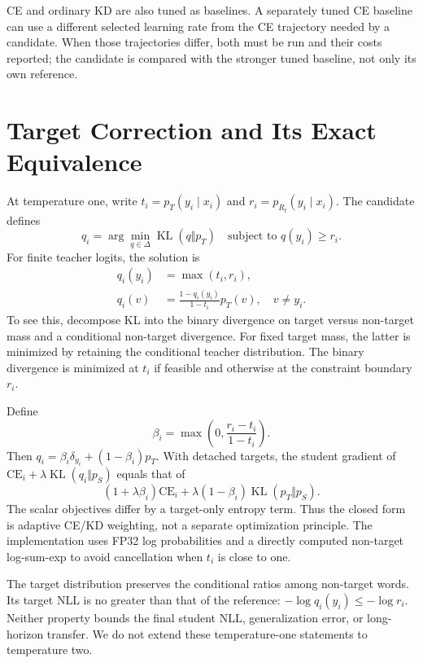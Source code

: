 \documentclass[11pt]{article}
\begin{document}
CE and ordinary KD are also tuned as baselines. A separately tuned CE
baseline can use a different selected learning rate from the CE trajectory
needed by a candidate. When those trajectories differ, both must be run and
their costs reported; the candidate is compared with the stronger tuned
baseline, not only its own reference.

\section{Target Correction and Its Exact Equivalence}
At temperature one, write $t_i=p_T(y_i\mid x_i)$ and
$r_i=p_{R_t}(y_i\mid x_i)$. The candidate defines
\begin{equation}
 q_i=\arg\min_{q\in\Delta}\operatorname{KL}(q\Vert p_T)
 \quad\text{subject to }q(y_i)\geq r_i.
\end{equation}
For finite teacher logits, the solution is
\begin{align}
 q_i(y_i)&=\max(t_i,r_i),\\
 q_i(v)&=\frac{1-q_i(y_i)}{1-t_i}p_T(v),\quad v\ne y_i.
\end{align}
To see this, decompose KL into the binary divergence on target versus
non-target mass and a conditional non-target divergence. For fixed target
mass, the latter is minimized by retaining the conditional teacher
distribution. The binary divergence is minimized at $t_i$ if feasible and
otherwise at the constraint boundary $r_i$.

Define
\begin{equation}
 \beta_i=\max\left(0,\frac{r_i-t_i}{1-t_i}\right).
\end{equation}
Then $q_i=\beta_i\delta_{y_i}+(1-\beta_i)p_T$. With detached targets,
the student gradient of $\mathrm{CE}_i+\lambda\operatorname{KL}(q_i\Vert p_S)$
equals that of
\begin{equation}
 (1+\lambda\beta_i)\mathrm{CE}_i
 +\lambda(1-\beta_i)\operatorname{KL}(p_T\Vert p_S).
\label{eq:equivalence}
\end{equation}
The scalar objectives differ by a target-only entropy term. Thus the
closed form is adaptive CE/KD weighting, not a separate optimization
principle. The implementation uses FP32 log probabilities and a directly
computed non-target log-sum-exp to avoid cancellation when $t_i$ is close
to one.

The target distribution preserves the conditional ratios among non-target
words. Its target NLL is no greater than that of the reference:
$-\log q_i(y_i)\leq-\log r_i$. Neither property
bounds the final student NLL, generalization error, or long-horizon transfer.
We do not extend these temperature-one statements to temperature two.
\end{document}
